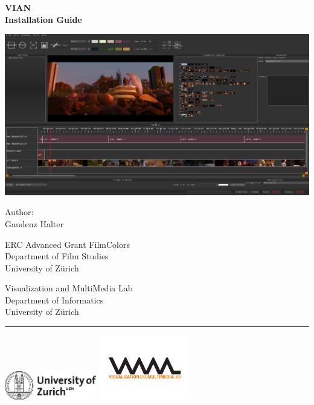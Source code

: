 \documentclass[11pt, a4paper,oneside,chapterprefix=false]{scrbook}
\begin{document}
\frontmatter
\begin{titlepage}
	\setlength{\parindent}{0cm}
	\addtolength{\textheight}{1.0cm}

	\vspace{0.5cm}
	\Huge
	{\textbf \textsf{VIAN\\ \huge Installation Guide}}

	\vfill \vfill \vfill
	\includegraphics*[width=1.0\textwidth]{figures/VIAN.png}

	\vfill
	\large
	Author:\\
	Gaudenz Halter\\
	

	\vfill \vfill \vfill
	\begin{minipage}[b]{0.5\textwidth}
	ERC Advanced Grant FilmColors\\
	Department of Film Studies \\
	University of Z{\"u}rich
	\end{minipage}
	\begin{minipage}[b]{0.5\textwidth} \raggedleft
	Visualization and MultiMedia Lab \\
	Department of Informatics \\
	University of Z{\"u}rich
	\end{minipage}

	\vfill
	\hrule
	\vspace{0.5cm}
	\includegraphics*[width=0.3\textwidth]{figures/uzh_logo} \hfill
	\includegraphics*[width=0.3\textwidth]{figures/vmml_logo}
\end{titlepage}
\end{document}
